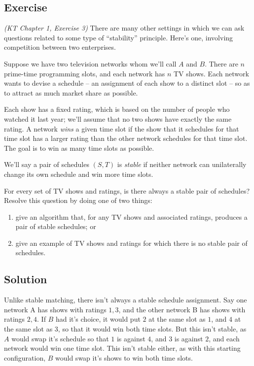 \documentclass{article}
\newcounter{counter}
\newcommand{\Exercise}{Exercise \stepcounter{counter}\thecounter}
\begin{document}
\subsection*{\Exercise}
    \textit{(KT Chapter 1, Exercise 3)} There are many other settings in which we can ask questions related to some type of ``stability'' principle.  Here's one, involving competition between two enterprises.  

    \vspace{3mm}
    Suppose we have two television networks whom we'll call $A$ and $B$.  There are $n$ prime-time
    programming slots, and each network has $n$ TV shows.  Each network wants to devise a schedule -- an assignment of each show to a distinct slot -- so as to attract as much market share as possible.

    \vspace{3mm}
    Each show has a fixed rating, which is based on the number of people who watched it last year;  we'll assume that no two shows have exactly the same rating.  A network {\it wins} a given time slot if the show that it schedules for that time slot has a larger rating than the other network schedules for that time slot.  The goal is to win as many time slots as possible.

    \vspace{3mm}
    We'll say a pair of schedules $(S, T)$ is {\it stable} if neither network can unilaterally change its own schedule and win more time slots.  

    \vspace{3mm}
    For every set of TV shows and ratings, is there always a stable pair of schedules?  Resolve this question by doing one of two things: 

    \begin{enumerate}
        \item give an algorithm that, for any TV shows and associated ratings, produces a pair of stable schedules; or
        \item give an example of TV shows and ratings for which there is no stable pair of schedules.  
    \end{enumerate}

\subsection*{Solution}
    Unlike stable matching, there isn't always a stable schedule assignment. Say one network A has shows with ratings $1,3$, and the other network B has shows with ratings $2,4$. If $B$ had it's choice, it would put $2$ at the same slot as $1$, and $4$ at the same slot as $3$, so that it would win both time slots. But this isn't stable, as $A$ would swap it's schedule so that $1$ is against $4$, and $3$ is against $2$, and each network would win one time slot. This isn't stable either, as with this starting configuration, $B$ would swap it's shows to win both time slots.
\end{document}

